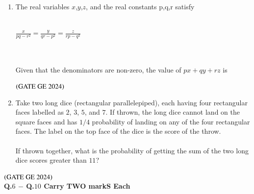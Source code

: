 \documentclass[journal,12pt,onecolumn]{IEEEtran}
\theoremstyle{remark}
\begin{document}
\begin{enumerate}
\item The real variables $x$,$y$,$z$, and the real constants p,q,r satisfy \\
\\
\centerline{\large $\frac{x}{pq-r^{2}}=\frac{y}{qr-p^{2}}=\frac{z}{rp-q^{2}}$}
\\ \\Given that the denominators are non-zero, the value of $px+qy+rz$ is
\begin{enumerate}
\end{enumerate}
\hfill $\brak{\text{GATE GE 2024}}$
\bigskip
\item Take two long dice (rectangular parallelepiped), each having four rectangular faces
labelled as $2$, $3$, 
$5$, and $7$. If thrown, the long dice cannot land on the square faces and has $1/4$ probability of landing on any of the four rectangular faces.
The label on the top face of the dice is the score of the throw.\\
\\If thrown together, what is the probability of getting the sum of the two long dice scores greater than $11$?
\begin{enumerate}
\end{enumerate}
\end{enumerate}
\hfill $\brak{\text{GATE GE 2024}}$
\bigskip
\\
\textbf{Q.$6$ $-$ Q.$10$ Carry TWO markS Each}\\
\end{document}
